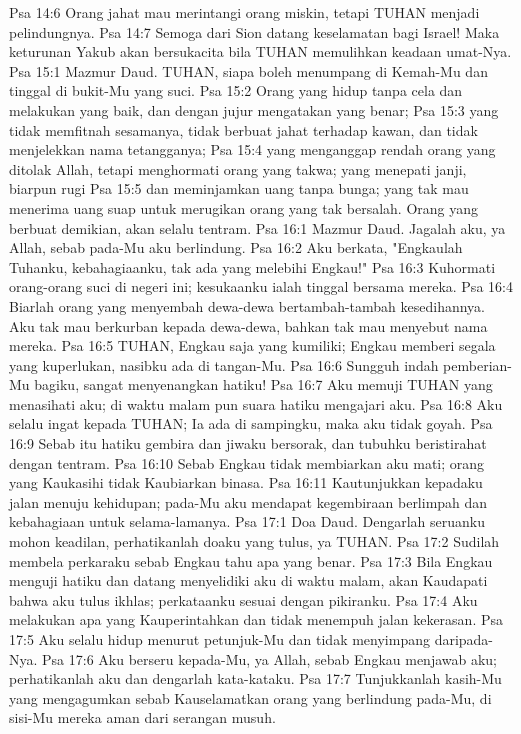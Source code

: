 Psa 14:6  Orang jahat mau merintangi orang miskin, tetapi TUHAN menjadi pelindungnya.
Psa 14:7  Semoga dari Sion datang keselamatan bagi Israel! Maka keturunan Yakub akan bersukacita bila TUHAN memulihkan keadaan umat-Nya.
Psa 15:1  Mazmur Daud. TUHAN, siapa boleh menumpang di Kemah-Mu dan tinggal di bukit-Mu yang suci.
Psa 15:2  Orang yang hidup tanpa cela dan melakukan yang baik, dan dengan jujur mengatakan yang benar;
Psa 15:3  yang tidak memfitnah sesamanya, tidak berbuat jahat terhadap kawan, dan tidak menjelekkan nama tetangganya;
Psa 15:4  yang menganggap rendah orang yang ditolak Allah, tetapi menghormati orang yang takwa; yang menepati janji, biarpun rugi
Psa 15:5  dan meminjamkan uang tanpa bunga; yang tak mau menerima uang suap untuk merugikan orang yang tak bersalah. Orang yang berbuat demikian, akan selalu tentram.
Psa 16:1  Mazmur Daud. Jagalah aku, ya Allah, sebab pada-Mu aku berlindung.
Psa 16:2  Aku berkata, "Engkaulah Tuhanku, kebahagiaanku, tak ada yang melebihi Engkau!"
Psa 16:3  Kuhormati orang-orang suci di negeri ini; kesukaanku ialah tinggal bersama mereka.
Psa 16:4  Biarlah orang yang menyembah dewa-dewa bertambah-tambah kesedihannya. Aku tak mau berkurban kepada dewa-dewa, bahkan tak mau menyebut nama mereka.
Psa 16:5  TUHAN, Engkau saja yang kumiliki; Engkau memberi segala yang kuperlukan, nasibku ada di tangan-Mu.
Psa 16:6  Sungguh indah pemberian-Mu bagiku, sangat menyenangkan hatiku!
Psa 16:7  Aku memuji TUHAN yang menasihati aku; di waktu malam pun suara hatiku mengajari aku.
Psa 16:8  Aku selalu ingat kepada TUHAN; Ia ada di sampingku, maka aku tidak goyah.
Psa 16:9  Sebab itu hatiku gembira dan jiwaku bersorak, dan tubuhku beristirahat dengan tentram.
Psa 16:10  Sebab Engkau tidak membiarkan aku mati; orang yang Kaukasihi tidak Kaubiarkan binasa.
Psa 16:11  Kautunjukkan kepadaku jalan menuju kehidupan; pada-Mu aku mendapat kegembiraan berlimpah dan kebahagiaan untuk selama-lamanya.
Psa 17:1  Doa Daud. Dengarlah seruanku mohon keadilan, perhatikanlah doaku yang tulus, ya TUHAN.
Psa 17:2  Sudilah membela perkaraku sebab Engkau tahu apa yang benar.
Psa 17:3  Bila Engkau menguji hatiku dan datang menyelidiki aku di waktu malam, akan Kaudapati bahwa aku tulus ikhlas; perkataanku sesuai dengan pikiranku.
Psa 17:4  Aku melakukan apa yang Kauperintahkan dan tidak menempuh jalan kekerasan.
Psa 17:5  Aku selalu hidup menurut petunjuk-Mu dan tidak menyimpang daripada-Nya.
Psa 17:6  Aku berseru kepada-Mu, ya Allah, sebab Engkau menjawab aku; perhatikanlah aku dan dengarlah kata-kataku.
Psa 17:7  Tunjukkanlah kasih-Mu yang mengagumkan sebab Kauselamatkan orang yang berlindung pada-Mu, di sisi-Mu mereka aman dari serangan musuh.
